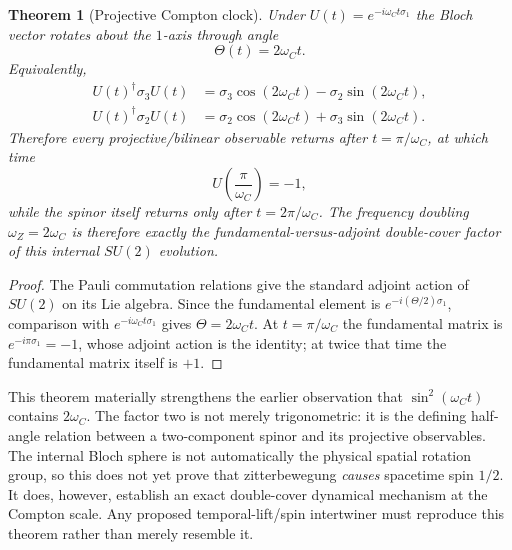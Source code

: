 \documentclass[11pt]{article}
\newtheorem{theorem}{Theorem}[section]
\theoremstyle{definition}\newtheorem{definition}[theorem]{Definition}
\theoremstyle{remark}\newtheorem{remark}[theorem]{Remark}\newtheorem{conjecture}[theorem]{Conjecture}
\begin{document}
\begin{theorem}[Projective Compton clock]\label{thm:projectiveclock}
Under $U(t)=e^{-i\omega_Ct\sigma_1}$ the Bloch vector rotates about the $1$-axis through angle
\begin{equation}\label{eq:blochangle}
 \Theta(t)=2\omega_Ct.
\end{equation}
Equivalently,
\begin{align}
 U(t)^\dagger\sigma_3U(t)&=\sigma_3\cos(2\omega_Ct)-\sigma_2\sin(2\omega_Ct),\\
 U(t)^\dagger\sigma_2U(t)&=\sigma_2\cos(2\omega_Ct)+\sigma_3\sin(2\omega_Ct).
\end{align}
Therefore every projective/bilinear observable returns after $t=\pi/\omega_C$, at which time
\begin{equation}\label{eq:deckclock}
 U\!\left(\frac{\pi}{\omega_C}\right)=-1,
\end{equation}
while the spinor itself returns only after $t=2\pi/\omega_C$. The frequency doubling $\omega_Z=2\omega_C$ is therefore exactly the fundamental-versus-adjoint double-cover factor of this internal $SU(2)$ evolution.
\end{theorem}
\begin{proof}
The Pauli commutation relations give the standard adjoint action of $SU(2)$ on its Lie algebra. Since the fundamental element is $e^{-i(\Theta/2)\sigma_1}$, comparison with $e^{-i\omega_Ct\sigma_1}$ gives $\Theta=2\omega_Ct$. At $t=\pi/\omega_C$ the fundamental matrix is $e^{-i\pi\sigma_1}=-1$, whose adjoint action is the identity; at twice that time the fundamental matrix itself is $+1$.
\end{proof}

This theorem materially strengthens the earlier observation that $\sin^2(\omega_Ct)$ contains $2\omega_C$. The factor two is not merely trigonometric: it is the defining half-angle relation between a two-component spinor and its projective observables. The internal Bloch sphere is not automatically the physical spatial rotation group, so this does not yet prove that zitterbewegung \emph{causes} spacetime spin $1/2$. It does, however, establish an exact double-cover dynamical mechanism at the Compton scale. Any proposed temporal-lift/spin intertwiner must reproduce this theorem rather than merely resemble it.
\end{document}

